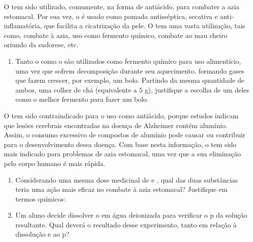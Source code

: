 	O  tem sido utilizado, comumente, na forma de antiácido, para combater a azia estomacal.
	Por sua vez, o  é usado como pomada antisséptica, secativa e anti-inflamatória, que facilita a cicatrização da pele.
	O  tem uma vasta utilização, tais como, combate à azia, uso como fermento químico, combate ao mau cheiro oriundo da sudorese, etc.

\begin{enumerate}[resume*]
	\item Tanto o  como o  são utilizados como fermento químico para uso alimentício, uma vez que sofrem decomposição durante seu aquecimento, formando gases que fazem crescer, por exemplo, um bolo.
		Partindo da mesma quantidade de ambos, uma colher de chá (equivalente a $5$ g), justifique a escolha de um deles como o melhor fermento para fazer um bolo.
\end{enumerate}

	O  tem sido contraindicado para o uso como antiácido, porque estudos indicam que lesões cerebrais encontradas na doença de Alzheimer contém alumínio.
	Assim, o consumo excessivo de compostos de alumínio pode causar ou contribuir para o desenvolvimento dessa doença.
	Com base nesta informação, o  tem sido mais indicado para problemas de azia estomacal, uma vez que a sua eliminação pelo corpo humano é mais rápida.

\begin{enumerate}[resume*]
	\item Considerando uma mesma dose medicinal de  e , qual das duas substâncias teria uma ação mais eficaz no combate à azia estomacal?
		Justifique em termos químicos:
	\item Um aluno decide dissolver o  em água deionizada para verificar o p da solução resultante.
		Qual deverá o resultado desse experimento, tanto em relação à dissolução e ao p?
\end{enumerate}
